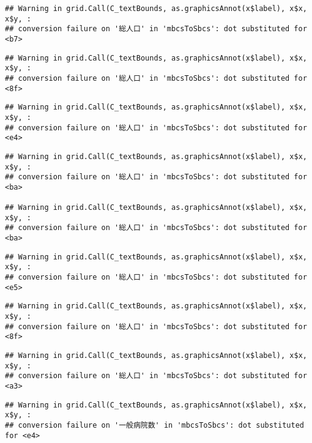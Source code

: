 \documentclass[
]{article}
\begin{document}
\begin{verbatim}
## Warning in grid.Call(C_textBounds, as.graphicsAnnot(x$label), x$x, x$y, :
## conversion failure on '総人口' in 'mbcsToSbcs': dot substituted for <b7>
\end{verbatim}

\begin{verbatim}
## Warning in grid.Call(C_textBounds, as.graphicsAnnot(x$label), x$x, x$y, :
## conversion failure on '総人口' in 'mbcsToSbcs': dot substituted for <8f>
\end{verbatim}

\begin{verbatim}
## Warning in grid.Call(C_textBounds, as.graphicsAnnot(x$label), x$x, x$y, :
## conversion failure on '総人口' in 'mbcsToSbcs': dot substituted for <e4>
\end{verbatim}

\begin{verbatim}
## Warning in grid.Call(C_textBounds, as.graphicsAnnot(x$label), x$x, x$y, :
## conversion failure on '総人口' in 'mbcsToSbcs': dot substituted for <ba>

## Warning in grid.Call(C_textBounds, as.graphicsAnnot(x$label), x$x, x$y, :
## conversion failure on '総人口' in 'mbcsToSbcs': dot substituted for <ba>
\end{verbatim}

\begin{verbatim}
## Warning in grid.Call(C_textBounds, as.graphicsAnnot(x$label), x$x, x$y, :
## conversion failure on '総人口' in 'mbcsToSbcs': dot substituted for <e5>
\end{verbatim}

\begin{verbatim}
## Warning in grid.Call(C_textBounds, as.graphicsAnnot(x$label), x$x, x$y, :
## conversion failure on '総人口' in 'mbcsToSbcs': dot substituted for <8f>
\end{verbatim}

\begin{verbatim}
## Warning in grid.Call(C_textBounds, as.graphicsAnnot(x$label), x$x, x$y, :
## conversion failure on '総人口' in 'mbcsToSbcs': dot substituted for <a3>
\end{verbatim}

\begin{verbatim}
## Warning in grid.Call(C_textBounds, as.graphicsAnnot(x$label), x$x, x$y, :
## conversion failure on '一般病院数' in 'mbcsToSbcs': dot substituted for <e4>
\end{verbatim}
\end{document}
